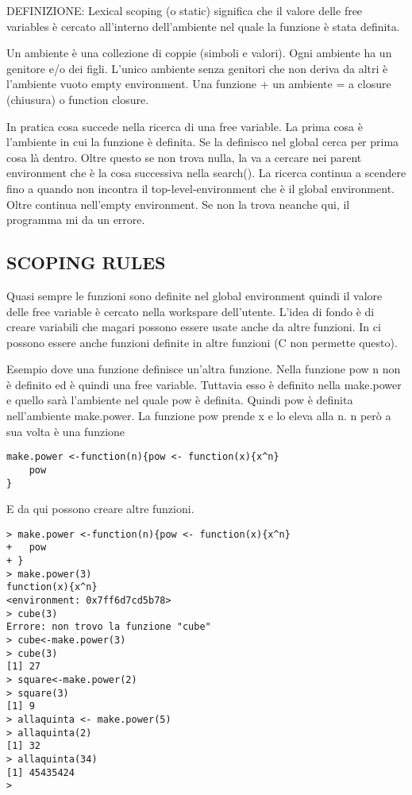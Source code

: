 DEFINIZIONE: Lexical scoping (o static) significa che \erre il valore delle free variables è cercato all'interno dell'ambiente nel quale la funzione è stata definita.

Un ambiente è una collezione di coppie (simboli e valori).
Ogni ambiente ha un genitore e/o dei figli.
L'unico ambiente senza genitori che non deriva da altri è l'ambiente vuoto
empty environment.
Una funzione + un ambiente = a closure (chiusura) o function closure.

In pratica cosa succede nella ricerca di una free variable.
La prima cosa è l'ambiente in cui la funzione è definita. Se la definisco nel global
\erre cerca per prima cosa là dentro.
Oltre questo se non trova nulla, la va a cercare nei parent environment che è la cosa
successiva nella search().
La ricerca continua a scendere fino a quando non incontra il top-level-environment che è il global environment.
Oltre continua nell'empty environment. Se non la trova neanche qui, il programma mi da un errore.

\subsection{\erre SCOPING RULES}

Quasi sempre le funzioni sono definite nel global environment quindi il valore
delle free variable è cercato nella workspare dell'utente.
L'idea di fondo è di creare variabili che magari possono essere usate anche da altre funzioni.
In \erre ci possono essere anche funzioni definite in altre funzioni (C non permette questo).

Esempio dove una funzione definisce un'altra funzione. Nella funzione pow n non è definito
ed è quindi una free variable. Tuttavia esso è definito nella make.power e quello sarà
l'ambiente nel quale pow è definita.
Quindi pow è definita nell'ambiente make.power.
La funzione pow prende x e lo eleva alla n. n però a sua volta è una funzione
\begin{lstlisting}
make.power <-function(n){pow <- function(x){x^n}
	pow
}
\end{lstlisting}
E da qui possono creare altre funzioni.
\begin{lstlisting}
> make.power <-function(n){pow <- function(x){x^n}
+ 	pow
+ }
> make.power(3)
function(x){x^n}
<environment: 0x7ff6d7cd5b78>
> cube(3)
Errore: non trovo la funzione "cube"
> cube<-make.power(3)
> cube(3)
[1] 27
> square<-make.power(2)
> square(3)
[1] 9
> allaquinta <- make.power(5)
> allaquinta(2)
[1] 32
> allaquinta(34)
[1] 45435424
> 
\end{lstlisting}

